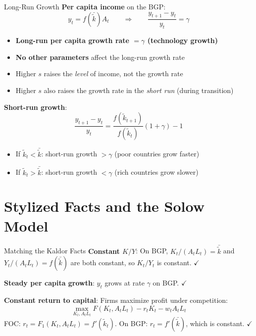 \documentclass[blue]{beamer}
\begin{document}
\begin{frame}{Long-Run Growth}
	\textbf{Per capita income} on the BGP:
	\[
	y_t = f(\bar{\tilde{k}})A_t \qquad \Rightarrow \qquad \frac{y_{t+1} - y_t}{y_t} = \gamma
	\]
		\vspace{-20pt}
	\begin{itemize}
		\item \textbf{Long-run per capita growth rate $= \gamma$ (technology growth)}
		\item \textbf{No other parameters} affect the long-run growth rate
		\item Higher $s$ raises the \emph{level} of income, not the growth rate
		\item Higher $s$ also raises the growth rate in the \emph{short run} (during transition)
	\end{itemize}
	

	\textbf{Short-run growth}:
	\[
	\frac{y_{t+1} - y_t}{y_t} = \frac{f(\tilde{k}_{t+1})}{f(\tilde{k}_t)}(1+\gamma) - 1
	\]
		\vspace{-15pt}
	\begin{itemize}
		\item If $\tilde{k}_t < \bar{\tilde{k}}$: short-run growth $> \gamma$ (poor countries grow faster)
		\item If $\tilde{k}_t > \bar{\tilde{k}}$: short-run growth $< \gamma$ (rich countries grow slower)
	\end{itemize}
\end{frame}

\section{Stylized Facts and the Solow Model}

\begin{frame}{Matching the Kaldor Facts}
	\textbf{Constant $K/Y$}: On BGP, $K_t/(A_t L_t) = \bar{\tilde{k}}$ and $Y_t/(A_t L_t) = f(\bar{\tilde{k}})$ are both constant, so $K_t/Y_t$ is constant. $\checkmark$
	
	\bigskip
	\textbf{Steady per capita growth}: $y_t$ grows at rate $\gamma$ on BGP. $\checkmark$
	
	\bigskip
	\textbf{Constant return to capital}: Firms maximize profit under competition:
	\[
	\max_{K_t, A_t L_t} F(K_t, A_t L_t) - r_t K_t - w_t A_t L_t
	\]
	FOC: $r_t = F_1(K_t, A_t L_t) = f'(\tilde{k}_t)$. On BGP: $r_t = f'(\bar{\tilde{k}})$, which is constant. $\checkmark$
\end{frame}
\end{document}
